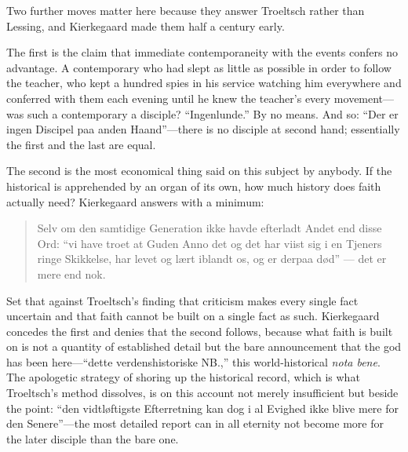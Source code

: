 Two further moves matter here because they answer Troeltsch rather than Lessing, and Kierkegaard made them half a century early.

The first is the claim that immediate contemporaneity with the events confers no advantage. A contemporary who had slept as little as possible in order to follow the teacher, who kept a hundred spies in his service watching him everywhere and conferred with them each evening until he knew the teacher's every movement---was such a contemporary a disciple? ``Ingenlunde.'' By no means. And so: ``Der er ingen Discipel paa anden Haand''---there is no disciple at second hand; essentially the first and the last are equal.

The second is the most economical thing said on this subject by anybody. If the historical is apprehended by an organ of its own, how much history does faith actually need? Kierkegaard answers with a minimum:

\begin{quote}\small
Selv om den samtidige Generation ikke havde efterladt Andet end disse Ord: ``vi have troet at Guden Anno det og det har viist sig i en Tjeners ringe Skikkelse, har levet og l\ae rt iblandt os, og er derpaa d\o d'' --- det er mere end nok.
\end{quote}

Set that against Troeltsch's finding that criticism makes every single fact uncertain and that faith cannot be built on a single fact as such. Kierkegaard concedes the first and denies that the second follows, because what faith is built on is not a quantity of established detail but the bare announcement that the god has been here---``dette verdenshistoriske NB.,'' this world-historical \emph{nota bene}. The apologetic strategy of shoring up the historical record, which is what Troeltsch's method dissolves, is on this account not merely insufficient but beside the point: ``den vidtl\o ftigste Efterretning kan dog i al Evighed ikke blive mere for den Senere''---the most detailed report can in all eternity not become more for the later disciple than the bare one.

